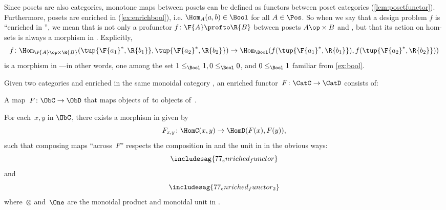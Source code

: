 Since posets are also categories, monotone maps between posets can be defined as functors between poset categories (\cref{lem:posetfunctor}). Furthermore, posets are enriched in \Bool (\cref{ex:enrichbool}), i.e. $\Hom_A(a,b) \in \Bool$ for all $A \in \Pos$. So when we say that a design problem $f$ is ``enriched in \Bool'', we mean that is not only a profunctor $f \colon \F{A} \profto \R{B}$ between posets $A\op \times B$ and \Bool, but that its action on hom-sets is always a morphism in \Bool. Explicitly,
\begin{equation*}
  f \colon \Hom_{\F{A}\op \times \R{B}}(\tup{\F{a_1}^*,\R{b_1}}, \tup{\F{a_2}^*,\R{b_2}}) \to \Hom_\Bool(f(\tup{\F{a_1}^*,\R{b_1}}), f(\tup{\F{a_2}^*,\R{b_2}}))
\end{equation*}
is a morphism in \Bool---in other words, one among the set $1 \leq_\Bool 1, 0 \leq_\Bool 0$, and $0 \leq_\Bool 1$ familiar from \cref{ex:bool}.

\begin{ctdefinition}
  \label{defn:enrichedfunctor}
  Given two categories \CatC and \CatD enriched in the same monoidal category \CatV, an enriched functor~$F\colon \CatC \to \CatD$ consists of:
  \begin{compactenum}
    \item A map~$F\colon \ObC \to \ObD$ that maps objects of~\CatC to objects of~\CatD.
    \item For each~$x, y$ in $\ObC$, there exists a morphism in \CatV given by
    \begin{equation*}
      F_{x,y} \colon \HomC(x,y) \to \HomD(F(x), F(y)),
    \end{equation*}
    such that composing maps ``across~$F$'' respects the composition in \CatC and the unit in \CatV in the obvious ways:
    \begin{equation}
      \includesag{77_enriched_functor}
    \end{equation}
    and
    \begin{equation*}
      \includesag{77_enriched_functor_2}
    \end{equation*}
    where~$\otimes$ and~$\One$ are the monoidal product and monoidal unit in \CatV.
  \end{compactenum}
\end{ctdefinition}

